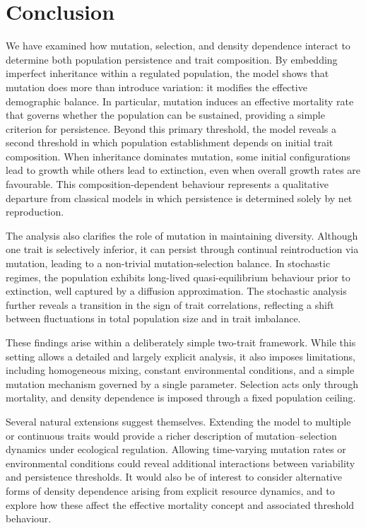 \documentclass[12pt]{article}
\begin{document}
\section{Conclusion}

We have examined how mutation, selection, and density dependence
interact to determine both population persistence and trait composition.
By embedding imperfect inheritance within a regulated population, the
model shows that mutation does more than introduce variation: it
modifies the effective demographic balance. In particular, mutation
induces an effective mortality rate that governs whether the population
can be sustained, providing a simple criterion for persistence. Beyond
this primary threshold, the model reveals a second threshold in which
population establishment depends on initial trait composition. When
inheritance dominates mutation, some initial configurations lead to
growth while others lead to extinction, even when overall growth rates
are favourable. This composition-dependent behaviour represents a
qualitative departure from classical models in which persistence is
determined solely by net reproduction.

The analysis also clarifies the role of mutation in maintaining
diversity. Although one trait is selectively inferior, it can persist
through continual reintroduction via mutation, leading to a non-trivial
mutation-selection balance. In stochastic regimes, the population
exhibits long-lived quasi-equilibrium behaviour prior to extinction,
well captured by a diffusion approximation. The stochastic analysis
further reveals a transition in the sign of trait correlations,
reflecting a shift between fluctuations in total population size and in
trait imbalance.

These findings arise within a deliberately simple two-trait framework. While this setting allows a detailed and largely explicit analysis, it also imposes limitations, including homogeneous mixing, constant environmental conditions, and a simple mutation mechanism governed by a single parameter. Selection acts only through mortality, and density dependence is imposed through a fixed population ceiling.

Several natural extensions suggest themselves. Extending the model to multiple or continuous traits would provide a richer description of mutation–selection dynamics under ecological regulation. Allowing time-varying mutation rates or environmental conditions could reveal additional interactions between variability and persistence thresholds. It would also be of interest to consider alternative forms of density dependence arising from explicit resource dynamics, and to explore how these affect the effective mortality concept and associated threshold behaviour.
\end{document}
